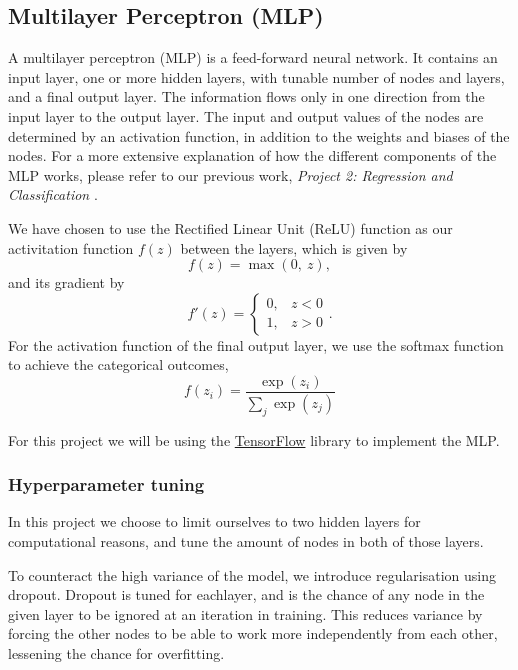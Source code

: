 \documentclass[a4paper, 11pt, twocolumn]{article}
\begin{document}
\subsection{Multilayer Perceptron (MLP)}
A multilayer perceptron (MLP) is a feed-forward neural network. It contains an
input layer, one or more hidden layers, with tunable number of nodes and layers,
and a final output layer. The information flows only in one direction from the
input layer to the output layer. The input and output values of the nodes are
determined by an activation function, in addition to the weights and biases of
the nodes. For a more extensive explanation of how the different components of
the MLP works, please refer to our previous work, \textit{Project 2: Regression
and Classification} \cite{project2}.

We have chosen to use the Rectified Linear Unit (ReLU) function as our
activitation function $f(z)$ between the layers, which is given by
\begin{equation}
      f(z) = \max (0,\ z),
\end{equation}
and its gradient by
\begin{equation}
      f'(z) =
      \begin{cases}
            0, &  z<0\\
            1, &  z>0
      \end{cases}.
\end{equation}
For the activation function of the final output layer, we use the softmax
function to achieve the categorical outcomes,
\begin{equation}
      f(z_i)=\frac{\exp(z_i)}{\sum_j \exp(z_j)}
\end{equation}

For this project we will be using the \href{https://www.tensorflow.org/}
{TensorFlow} library to implement the MLP.

\subsubsection{Hyperparameter tuning}
In this project we choose to limit ourselves to two hidden layers for 
computational reasons, and tune the amount of nodes in both of those layers.

To counteract the high variance of the model, we introduce regularisation using 
dropout. Dropout is tuned for eachlayer, and is the chance of any node in the 
given layer to be ignored at an iteration in training. This reduces variance by 
forcing the other nodes to be able to work more independently from each other, 
lessening the chance for overfitting.
\end{document}
